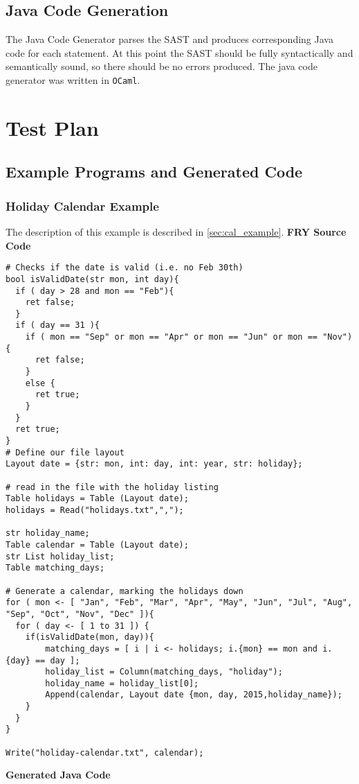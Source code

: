\documentclass{article}
\begin{document}
\subsection{Java Code Generation}
The Java Code Generator parses the SAST and produces corresponding Java code for each statement. At this point the SAST should be fully syntactically and semantically sound, so there should be no errors produced. The java code generator was written in \texttt{OCaml}.

\section{Test Plan}
\subsection{Example Programs and Generated Code}
\subsubsection{Holiday Calendar Example}
The description of this example is described in \ref{sec:cal_example}.
\textbf{FRY Source Code}
\begin{lstlisting}
# Checks if the date is valid (i.e. no Feb 30th)
bool isValidDate(str mon, int day){
  if ( day > 28 and mon == "Feb"){
    ret false;
  }
  if ( day == 31 ){
    if ( mon == "Sep" or mon == "Apr" or mon == "Jun" or mon == "Nov"){
      ret false;
    }
    else {
      ret true;
    }
  }
  ret true;
}
# Define our file layout
Layout date = {str: mon, int: day, int: year, str: holiday};

# read in the file with the holiday listing
Table holidays = Table (Layout date);
holidays = Read("holidays.txt",",");

str holiday_name;
Table calendar = Table (Layout date);
str List holiday_list;
Table matching_days;

# Generate a calendar, marking the holidays down
for ( mon <- [ "Jan", "Feb", "Mar", "Apr", "May", "Jun", "Jul", "Aug", "Sep", "Oct", "Nov", "Dec" ]){
  for ( day <- [ 1 to 31 ]) {
    if(isValidDate(mon, day)){
        matching_days = [ i | i <- holidays; i.{mon} == mon and i.{day} == day ];
        holiday_list = Column(matching_days, "holiday");
        holiday_name = holiday_list[0];
        Append(calendar, Layout date {mon, day, 2015,holiday_name});
    }
  }
}

Write("holiday-calendar.txt", calendar);
\end{lstlisting}
\textbf{Generated Java Code}
\end{document}
